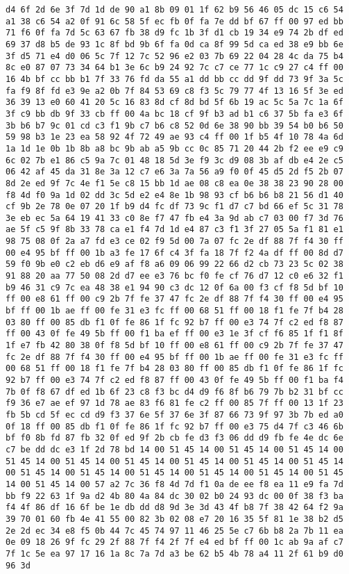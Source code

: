 \documentclass{article}
\begin{document}
\begin{verbatim}
d4 6f 2d 6e 3f 7d 1d de 90 a1 8b 09 01 1f 62 b9 56 46 05 dc 15 c6 54 a1 38 c6 54 a2 0f 91 6c 58 5f ec fb 0f fa 7e dd bf 67 ff 00 97 ed bb 71 f6 0f fa 7d 5c 63 67 fb 38 d9 fc 1b 3f d1 cb 19 34 e9 74 2b df ed 69 37 d8 b5 de 93 1c 8f bd 9b 6f fa 0d ca 8f 99 5d ca ed 38 e9 bb 6e 3f d5 71 e4 d0 06 5c 7f 12 7c 52 96 e2 03 7b 69 22 04 28 4c da 75 b4 8c e0 87 07 73 34 64 b1 3e 6c b9 24 92 7c c7 ce 77 1c c9 27 c4 ff 00 16 4b bf cc bb b1 7f 33 76 fd da 55 a1 dd bb cc dd 9f dd 73 9f 3a 5c fa f9 8f fd e3 9e a2 0b 7f 84 53 69 c8 f3 5c 79 77 4f 13 16 5f 3e ed 36 39 13 e0 60 41 20 5c 16 83 8d cf 8d bd 5f 6b 19 ac 5c 5a 7c 1a 6f 3f c9 bb db 9f 33 cb ff 00 4a bc 18 cf 9f b3 ad b1 c6 37 5b fa e3 6f 3b b6 b7 9c 01 cd c3 f1 9b c7 b6 c8 52 0d 6e 38 90 bb 39 54 b0 b6 50 59 98 b3 1e 23 ea 58 92 4f 72 49 ae 93 c4 ff 00 1f b5 4f 10 78 4a 6d 1a 1d 1e 0b 1b 8b a8 bc 9b ab a5 9b cc 0c 85 71 20 44 2b f2 ee e9 c9 6c 02 7b e1 86 c5 9a 7c 01 48 18 5d 3e f9 3c d9 08 3b af db e4 2e c5 06 42 af 45 da 31 8e 3a 12 c7 e6 3a 7a 56 a9 f0 0f 45 d5 2d f5 2b 07 8d 2e ed 9f 7c 4e f1 5e c8 15 bb 1d ae 08 c8 ea 0e 38 38 23 90 28 00 f8 4d f0 9a 1d 02 dd 3c 5d e2 e4 8e 1b 98 93 cf b6 b6 b8 21 56 d1 40 cf 9b 2e 78 0e 07 20 1f b9 d4 fc df 73 9c f1 d7 c7 bd 66 ef 5c 31 78 3e eb ec 5a 64 19 41 33 c0 8e f7 47 fb e4 3a 9d ab c7 03 00 f7 3d 76 ae 5f c5 9f 8b 33 78 ca e1 f4 7d 1d e4 87 c3 f1 3f 27 05 5a f1 81 e1 98 75 08 0f 2a a7 fd e3 ce 02 f9 5d 00 7a 07 fc 2e df 88 7f f4 30 ff 00 e4 95 bf ff 00 1b a3 fe 17 6f c4 3f fa 18 7f f2 4a df ff 00 8d d7 59 f0 9b e0 c2 eb d6 e9 af f8 a6 09 06 99 22 66 d2 cb 73 23 5c 02 38 91 88 20 aa 77 50 08 2d d7 ee e3 76 bc f0 fe cf 76 d7 12 c0 e6 32 f1 b9 46 31 c9 7c ea 48 38 e1 94 90 c3 dc 12 0f 6a 00 f3 cf f8 5d bf 10 ff 00 e8 61 ff 00 c9 2b 7f fe 37 47 fc 2e df 88 7f f4 30 ff 00 e4 95 bf ff 00 1b ae ff 00 fe 31 e3 fc ff 00 68 51 ff 00 18 f1 fe 7f b4 28 03 80 ff 00 85 db f1 0f fe 86 1f fc 92 b7 ff 00 e3 74 7f c2 ed f8 87 ff 00 43 0f fe 49 5b ff 00 f1 ba ef ff 00 e3 1e 3f cf f6 85 1f f1 8f 1f e7 fb 42 80 38 0f f8 5d bf 10 ff 00 e8 61 ff 00 c9 2b 7f fe 37 47 fc 2e df 88 7f f4 30 ff 00 e4 95 bf ff 00 1b ae ff 00 fe 31 e3 fc ff 00 68 51 ff 00 18 f1 fe 7f b4 28 03 80 ff 00 85 db f1 0f fe 86 1f fc 92 b7 ff 00 e3 74 7f c2 ed f8 87 ff 00 43 0f fe 49 5b ff 00 f1 ba f4 7b 0f f8 67 df ed 1b 6f 23 c8 f3 bc d4 d9 f6 8f b6 79 7b b2 31 bf cc f9 36 e7 ae ef 97 1d 78 ae 83 f6 81 fe c2 ff 00 85 7f ff 00 13 1f 23 fb 5b cd 5f ec cd d9 f3 37 6e 5f 37 6e 3f 87 66 73 9f 97 3b 7b ed a0 0f 18 ff 00 85 db f1 0f fe 86 1f fc 92 b7 ff 00 e3 75 d4 7f c3 46 6b bf f0 8b fd 87 fb 32 0f ed 9f 2b cb fe d3 f3 06 dd d9 fb fe 4e dc 6e c7 be dd dc e3 1f 2d 78 bd 14 00 51 45 14 00 51 45 14 00 51 45 14 00 51 45 14 00 51 45 14 00 51 45 14 00 51 45 14 00 51 45 14 00 51 45 14 00 51 45 14 00 51 45 14 00 51 45 14 00 51 45 14 00 51 45 14 00 51 45 14 00 51 45 14 00 57 a2 7c 36 f8 4d 7d f1 0a de ee f8 ea 11 e9 fa 7d bb f9 22 63 1f 9a d2 4b 80 4a 84 dc 30 02 b0 24 93 dc 00 0f 38 f3 ba f4 4f 86 df 16 6f be 1e db dd d8 9d 3e 3d 43 4f b8 7f 38 42 64 f2 9a 39 70 01 60 fb 4e 41 55 00 82 3b 02 08 e7 20 16 35 5f 81 1e 38 b2 d5 2e 2d ec 34 e8 f5 0b 44 7c 45 74 97 11 46 25 5e c7 6b b8 2a 7b 11 ea 0e 09 18 26 9f fc 29 2f 88 7f f4 2f 7f e4 ed bf ff 00 1c ab 9a af c7 7f 1c 5e ea 97 17 16 1a 8c 7a 7d a3 be 62 b5 4b 78 a4 11 2f 61 b9 d0 96 3d 
\end{verbatim}
\end{document}
